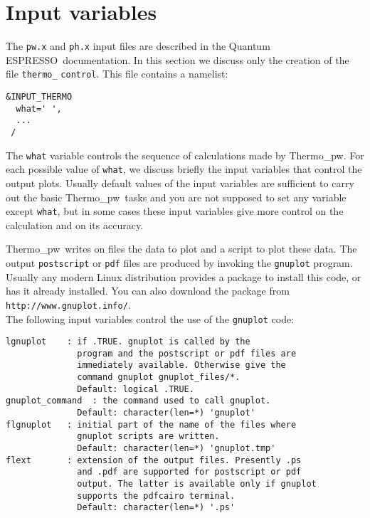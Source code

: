 \documentclass[12pt,a4paper,twoside]{report}
\def\qe{{\sc Quantum ESPRESSO}}
\def\thermo{{\sc Thermo\_pw}}
\begin{document}
{\color{dark-blue}\chapter{Input variables}}
\color{black}

The \texttt{pw.x} and \texttt{ph.x} input files are described in the \qe\ documentation.
In this section we discuss only the creation of the file
\texttt{thermo\_} \texttt{control}. This file contains a namelist:  

\begin{verbatim}
&INPUT_THERMO
  what=' ',
  ...
 /
\end{verbatim}

The \texttt{what} variable controls the sequence of calculations made
by \thermo. For each possible value of \texttt{what}, we discuss briefly the
input variables that control the output plots. Usually
default values of the input variables are sufficient to carry out  
the basic \thermo\ tasks and you are not supposed to set any variable except
\texttt{what}, but in some cases these input variables give more control
on the calculation and on its accuracy.

\thermo\ writes on files the data to plot and a script to plot
these data. The output \texttt{postscript} or \texttt{pdf} files are produced 
by invoking the 
\texttt{gnuplot} program. Usually any modern Linux 
distribution provides a package to install this code, or has it already 
installed. You can also download the package from 
\texttt{http://www.gnuplot.info/}. \\
The following input variables control the use of the \texttt{gnuplot} code:

\begin{verbatim}
lgnuplot    : if .TRUE. gnuplot is called by the 
              program and the postscript or pdf files are 
              immediately available. Otherwise give the 
              command gnuplot gnuplot_files/*.
              Default: logical .TRUE.
gnuplot_command  : the command used to call gnuplot.
              Default: character(len=*) 'gnuplot'
flgnuplot   : initial part of the name of the files where 
              gnuplot scripts are written.
              Default: character(len=*) 'gnuplot.tmp'
flext       : extension of the output files. Presently .ps 
              and .pdf are supported for postscript or pdf 
              output. The latter is available only if gnuplot 
              supports the pdfcairo terminal.
              Default: character(len=*) '.ps'
\end{verbatim}
\end{document}
